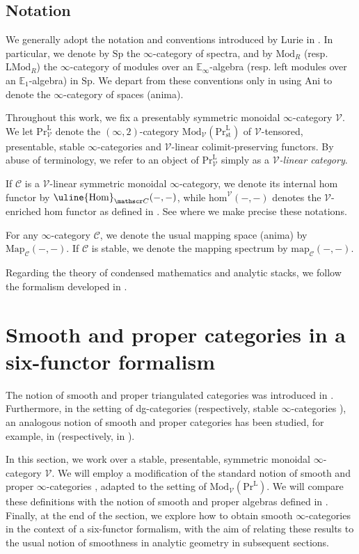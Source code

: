 \documentclass[oneside, hidelinks, 12pt, a4paper,reqno]{amsart}
\theoremstyle{plain}
\theoremstyle{definition}
\theoremstyle{plain}
\newcommand{\rL}{\mathrm L}
\newcommand{\cC}{\mathscr C}
\newcommand{\cV}{\mathscr V}
\newcommand{\bbE}{\mathbb E}
\newcommand{\Sp}{\mathrm{Sp}}
\newcommand{\cat}{$\infty$-category }
\newcommand{\cates}{$\infty$-categories }
\newcommand{\LPr}{\mathrm{Pr}^\rL}
\newcommand{\Hom}{\mathrm{Hom}}
\newcommand{\Mod}{\mathrm{Mod}}
\newcommand{\LMod}{\mathrm{LMod}}
\newcommand{\LPrV}{\mathrm{Pr}^{\mathrm{L}}_{\cV}}
\newcommand{\map}{\mathrm{map}}
\newcommand{\Ani}{\mathrm{Ani}}
\begin{document}
\subsection{Notation}
We generally adopt the notation and conventions introduced by Lurie in \cite{HTT,HA}. In particular, we denote by $\Sp$ the $\infty$-category of spectra, and by $\Mod_{R}$ (resp. $\LMod_{R}$) the $\infty$-category of modules over an $\bbE_{\infty}$-algebra (resp. left modules over an $\bbE_{1}$-algebra) in $\Sp$. We depart from these conventions only in using $\Ani$ to denote the $\infty$-category of spaces (anima).

Throughout this work, we fix a presentably symmetric monoidal $\infty$-category $\cV$. We let $\LPrV$ denote the $(\infty,2)$-category $\Mod_{\cV}(\LPr_{\mathrm{st}})$ of $\cV$-tensored, presentable, stable $\infty$-categories and $\cV$-linear colimit-preserving functors. By abuse of terminology, we refer to an object of $\LPrV$ simply as a \emph{$\cV$-linear category}.

If $\cC$ is a $\cV$-linear symmetric monoidal $\infty$-category, we denote its internal hom functor by $\uline{\Hom}_{\cC}(-,-)$, while $\mathrm{hom}^{\cV}(-,-)$ denotes the $\cV$-enriched hom functor as defined in \cite[Definition 4.20]{BenMoshe2024}. See  where we make precise these notations.

For any $\infty$-category $\cC$, we denote the usual mapping space (anima) by $\mathrm{Map}_{\cC}(-,-)$. If $\cC$ is stable, we denote the mapping spectrum by $\map_{\cC}(-,-)$.

Regarding the theory of condensed mathematics and analytic stacks, we follow the formalism developed in \cite{Clausen_Scholze_lectures}.


\section{Smooth and proper categories in a six-functor formalism}\label{section 1}
The notion of smooth and proper triangulated categories was introduced in \cite{kontsevich2008notes}.
Furthermore, in the setting of dg-categories (respectively, stable \cates), an analogous notion of smooth and proper categories has been studied, for example, in \cite{toen2007moduliobjectsdgcategories, efimov2018homotopyfinitenessdgcategories} (respectively, in \cite{SAG,Antieau_2014}).

In this section, we work over a stable, presentable, symmetric monoidal \cat $\cV$. We will employ a modification of the standard notion of smooth and proper \cates, adapted to the setting of $\Mod_{\cV}(\LPr)$.
We will compare these definitions with the notion of smooth and proper algebras defined in \cite[Definitions 4.6.4.2 and 4.6.4.13]{HA}.
Finally, at the end of the section, we explore how to obtain smooth \cates in the context of a six-functor formalism, with the aim of relating these results to the usual notion of smoothness in analytic geometry in subsequent sections.
\end{document}
